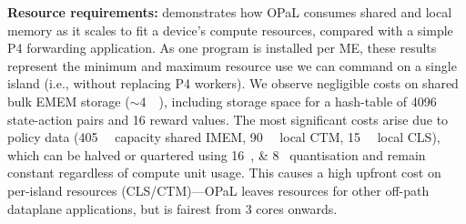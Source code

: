 \documentclass[sigconf,natbib=false]{acmart}
\newcommand{\fakepara}[1]{\noindent\textbf{#1:}}
\newcommand{\approachshort}{OPaL}
\newcommand{\Coopfw}{\emph{CoOp}}
\newcommand{\Indfw}{\emph{Ind}}
\begin{document}
\fakepara{Resource requirements}
 demonstrates how \approachshort{} consumes shared and local memory as it scales to fit a device's compute resources, compared with a simple P4 forwarding application.
As one program is installed per ME, these results represent the minimum and maximum resource use we can command on a single island (i.e., without replacing P4 workers).
We observe negligible costs on shared bulk EMEM storage ($\sim$\SI{4}{\mebi\byte}), including storage space for a hash-table of \num{4096} state-action pairs and \num{16} reward values.
The most significant costs arise due to policy data (\SI{405}{\kibi\byte} capacity shared IMEM, \SI{90}{\kibi\byte} local CTM, \SI{15}{\kibi\byte} local CLS), which can be halved or quartered using \SIlist{16;8}{\bit} quantisation and remain constant regardless of compute unit usage.
This causes a high upfront cost on per-island resources (CLS/CTM)---\approachshort{} leaves resources for other off-path dataplane applications, but is fairest from 3 cores onwards.

\end{document}
